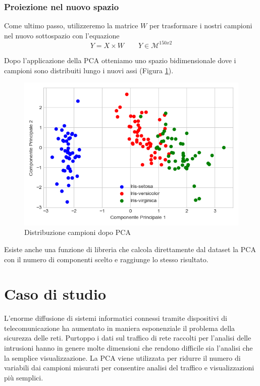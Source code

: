 \documentclass[12pt]{article}
\newcommand{\codice}[2]{}
\begin{document}
		\subsubsection{Proiezione nel nuovo spazio}
			Come ultimo passo, utilizzeremo la matrice $W$ per trasformare i nostri campioni nel nuovo sottospazio con l'equazione $$Y = X\times W \qquad Y \in \mathcal{M}^{150x2}$$
			\codice{132}{133}
			Dopo l'applicazione della \ac{PCA} otteniamo uno spazio bidimensionale dove i campioni sono distribuiti lungo i nuovi assi (Figura \ref{img:PCA}).
			\begin{figure}
				\begin{center}
					\includegraphics[scale=.5]{PCA}
					\caption{Distribuzione campioni dopo PCA}
					\label{img:PCA}
				\end{center}
			\end{figure}
			
			Esiste anche una funzione di libreria che calcola direttamente dal dataset la \ac{PCA} con il numero di componenti scelto e raggiunge lo stesso risultato.
			\codice{149}{151}
			
\section{Caso di studio}
	L'enorme diffusione di sistemi informatici connessi tramite dispositivi di telecomunicazione ha aumentato in maniera esponenziale il problema della sicurezza delle reti. Purtoppo i dati sul traffico di rete raccolti per l'analisi delle intrusioni hanno in genere molte dimensioni che rendono difficile sia l'analisi che la semplice visualizzazione. La \ac{PCA} viene utilizzata per ridurre il numero di variabili dai campioni misurati per consentire analisi del traffico e visualizzazioni più semplici.
	
\end{document}
